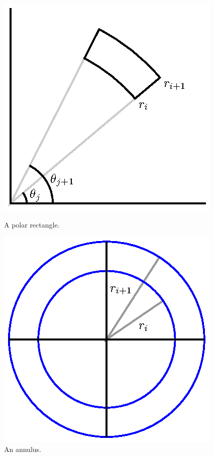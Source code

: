 \begin{figure}[ht]
\begin{center}
\begin{minipage}{2.5in}
\begin{center}
  \includegraphics{figures/fig_11_5_polar_rect.eps}
\end{center}
\caption{A polar rectangle.}
\label{F:11.5.Polar_area_a}
\end{minipage} \hspace{0.5in}
\begin{minipage}{2.5in}
\begin{center}
  \includegraphics{figures/fig_11_5_annulus.eps}
\end{center}
\caption{An annulus.}
\label{F:11.5.Polar_area_b}
\end{minipage}
\end{center}
\end{figure}


